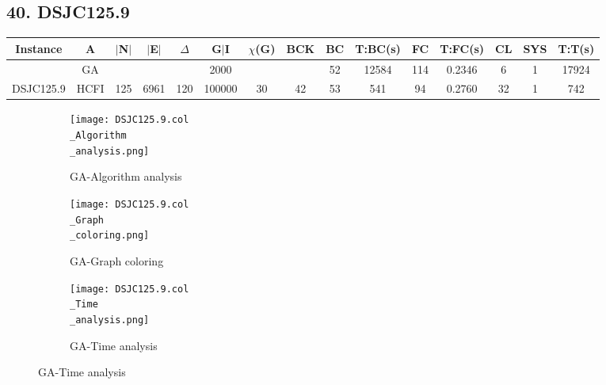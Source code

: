 \documentclass[10pt]{article}
\begin{document}
\subsection*{\hspace{0,9073976cm} 40. DSJC125.9}
\begin{table}[H]
\centering
\begin{tabular}{|c|c|c|c|c|c|c|c|c|c|c|c|c|c|c|}
\hline
Instance& A &$|$N$|$ & $|$E$|$ & $\Delta$ & G$|$I & $\chi$(G) &BCK&BC & T:BC(s) & FC & T:FC(s) & CL & SYS & T:T(s) \\ \hline \hline

	&GA&       &                   &                     &    2000     &     \cellcolor{yellow} & {\cellcolor{yellow}}& {{\cellcolor{green}52}}
&12584   &114        &0.2346                   &6                    &1          &17924        \\ \cline{2-2} \cline{6-6} \cline{9-15}
 \multirow{-2}{*}{DSJC125.9} &HCFI   &\multirow{-2}{*}{125}   &\multirow{-2}{*}{6961}     &\multirow{-2}{*}{120}     &100000     &\multirow{-2}{*}{\cellcolor{yellow}30}      & \multirow{-2}{*}{\cellcolor{yellow}42}    &{\cellcolor{green}53}     &541         &94    &0.2760         &32    &1     &742        \\  \hline
\end{tabular}
\end{table}
\graphicspath{{./Core1/Solutions/GA/DSJC125.9.col}}
\begin{figure}[H]
\begin{subfigure}{.33\textwidth}
  \centering
  \texttt{[image: DSJC125.9.col\\\_Algorithm\\\_analysis.png]}
  \caption{GA-Algorithm analysis}
   \label{fig:subfig1}
\end{subfigure}%
\begin{subfigure}{.33\textwidth}
  \centering
  \texttt{[image: DSJC125.9.col\\\_Graph\\\_coloring.png]}
  \caption{GA-Graph coloring}
  \label{fig:subfig2}
\end{subfigure}
\begin{subfigure}{.33\textwidth}
  \centering
  \texttt{[image: DSJC125.9.col\\\_Time\\\_analysis.png]}
  \caption{GA-Time analysis}
  \end{subfigure}
\end{figure}
\end{document}
